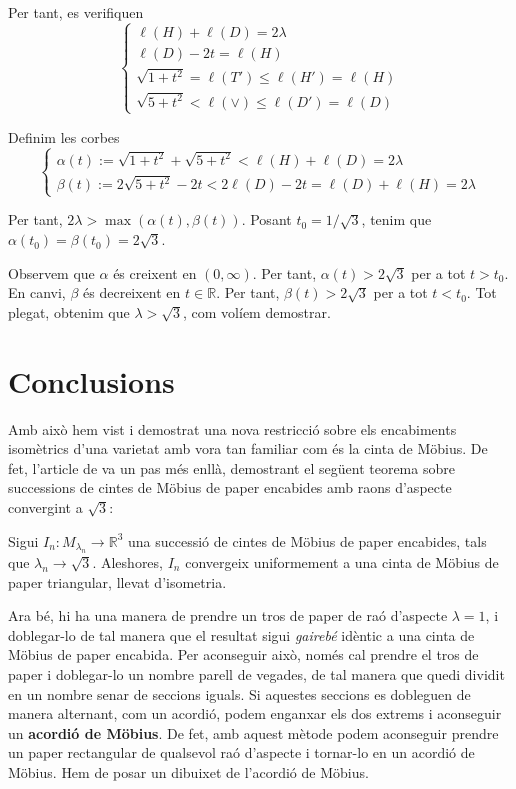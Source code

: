 Per tant, es verifiquen
\begin{equation*}
    \begin{cases}
        \ell(H) + \ell(D) = 2\lambda\\
        \ell(D)-2t=\ell(H)\\
        \sqrt{1+t^2}=\ell(T')\le\ell(H')=\ell(H)\\
        \sqrt{5+t^2}<\ell(\lor)\le\ell(D')=\ell(D)
    \end{cases}
\end{equation*}

Definim les corbes
\begin{equation*}
    \begin{cases}
        \alpha(t) := \sqrt{1+t^2} + \sqrt{5+t^2}<\ell(H) + \ell(D) = 2\lambda\\
        \beta(t) := 2\sqrt{5+t^2}-2t < 2\ell(D)-2t = \ell(D) + \ell(H) = 2\lambda
    \end{cases}
\end{equation*}

Per tant, $2\lambda > \max(\alpha(t),\beta(t))$. Posant $t_0 = 1/\sqrt{3}$, tenim que $\alpha(t_0) = \beta(t_0) = 2\sqrt3$.

Observem que $\alpha$ és creixent en $(0,\infty)$. Per tant, $\alpha(t)>2\sqrt3$ per a tot $t>t_0$. En canvi, $\beta$ és decreixent en $t\in\mathbb R$. Per tant, $\beta(t)>2\sqrt3$ per a tot $t<t_0$. Tot plegat, obtenim que $\lambda>\sqrt3$, com volíem demostrar.

\section{Conclusions}
Amb això hem vist i demostrat una nova restricció sobre els encabiments isomètrics d'una varietat amb vora tan familiar com és la cinta de Möbius. De fet, l'article de \cite{schwartz2024} va un pas més enllà, demostrant el següent teorema sobre successions de cintes de Möbius de paper encabides amb raons d'aspecte convergint a $\sqrt{3}$:

\begin{teo}\label{teo:Límit triangular}
    Sigui $I_n:M_{\lambda_n}\to\mathbb R^3$ una successió de cintes de Möbius de paper encabides, tals que $\lambda_n\to\sqrt{3}$. Aleshores, $I_n$ convergeix uniformement a una cinta de Möbius de paper triangular, llevat d'isometria.
\end{teo}

Ara bé, hi ha una manera de prendre un tros de paper de raó d'aspecte $\lambda = 1$, i doblegar-lo de tal manera que el resultat sigui \textit{gairebé} idèntic a una cinta de Möbius de paper encabida. Per aconseguir això, només cal prendre el tros de paper i doblegar-lo un nombre parell de vegades, de tal manera que quedi dividit en un nombre senar de seccions iguals. Si aquestes seccions es dobleguen de manera alternant, com un acordió, podem enganxar els dos extrems i aconseguir un \textbf{acordió de Möbius}. De fet, amb aquest mètode podem aconseguir prendre un paper rectangular de qualsevol raó d'aspecte i tornar-lo en un acordió de Möbius. 
{\color{blue} Hem de posar un dibuixet de l'acordió de Möbius.}

